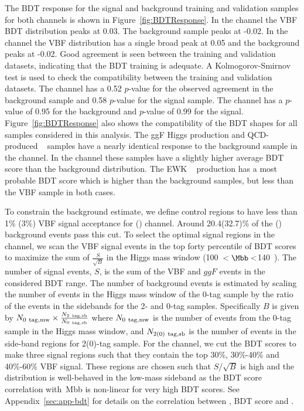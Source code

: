 The BDT response for  the signal and background training and validation samples for both channels is shown in Figure~\ref{fig:BDTResponse}.    In the \fourcentral channel the VBF \Hbb BDT distribution peaks at 0.03.  The background sample peaks at -0.02.  In the \twocentral channel the VBF \Hbb distribution has a single broad peak at 0.05 and the background peaks at -0.02. Good agreement is seen between the training and validation datasets, indicating that the BDT training is adequate.  A Kolmogorov-Smirnov test is used to check the compatibility between the training and validation datasets.  The \twocentral channel has a 0.52 $p$-value for the observed agreement in the background sample and 0.58 $p$-value for the signal sample. The \fourcentral channel has a $p$-value of 0.95 for the background and $p$-value of 0.99 for the signal.  Figure~\ref{fig:BDTResponse} also shows the compatibility of the BDT shapes for all samples considered in this analysis.  The ggF Higgs production and QCD-produced \zjets ~ samples have a nearly identical response to the background sample in the \fourcentral channel.  In the \twocentral channel these samples have a slightly higher average BDT score than the background distribution.  The EWK \zjets ~ production has a most probable BDT score which is higher than the background samples, but less than the VBF \Hbb sample in both cases. 

To constrain the background estimate, we define control regions to have less than 1\% (3\%) VBF signal acceptance for \twocentral(\fourcentral) channel. Around 20.4(32.7)\% of the \fourcentral(\twocentral) background events pass this cut. To select the optimal signal regions in the \fourcentral channel, we scan the VBF signal events in the top forty percentile of BDT scores to maximize the sum of $\frac{S}{\sqrt{B}}$ in the Higgs mass window (100~\GeV$<\Mbb<$140~\GeV).  The number of signal events, $S$, is the sum of the VBF and $ggF$ events in the considered BDT range.  The number of background events is estimated by scaling the number of events in the Higgs mass window of the 0-tag sample by the ratio of the events in the sidebands for the 2- and 0-tag samples. Specifically $B$ is given by $N_{\rm 0~tag, mw}\times \frac{N_{\rm 2~tag, sb}}{N_{\rm 0~tag, sb}}$ where  $N_{\rm 0~tag, mw}$ is the number of events from the 0-tag sample in the Higgs mass window, and $N_{\rm 2(0)~tag, sb}$ is the number of events in the side-band regions for 2(0)-tag sample. For the \twocentral channel, we cut the BDT scores to make three signal regions such that they contain the top 30\%, 30\%-40\% and 40\%-60\% VBF signal.   These regions are chosen such that $S/\sqrt{B}$ is high and the \Mbb{} distribution is well-behaved in the low-mass sideband as the BDT score correlation with\ Mbb{} is non-linear for very high BDT scores.  See Appendix~\ref{sec:app-bdt} for details on the correlation between \Mbb, BDT score and \pTbb. 

